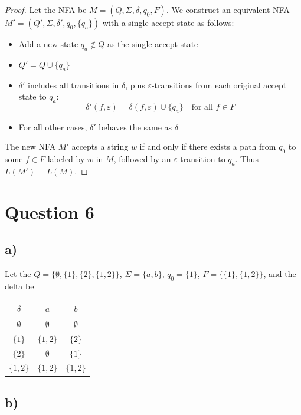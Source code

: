 \documentclass[a4paper, UTF-8]{article}
\theoremstyle{plain}
\begin{document}
\begin{proof}
Let the NFA be $M = (Q, \Sigma, \delta, q_0, F)$. We construct an equivalent NFA 
$M' = (Q', \Sigma, \delta', q_0, \{q_a\})$ with a single accept state as follows:

\begin{itemize}
    \item Add a new state $q_a \notin Q$ as the single accept state
    \item $Q' = Q \cup \{q_a\}$
    \item $\delta'$ includes all transitions in $\delta$, plus $\varepsilon$-transitions 
          from each original accept state to $q_a$:
          $$\delta'(f, \varepsilon) = \delta(f, \varepsilon) \cup \{q_a\} \quad \text{for all } f \in F$$
    \item For all other cases, $\delta'$ behaves the same as $\delta$
\end{itemize}

The new NFA $M'$ accepts a string $w$ if and only if there exists a path from $q_0$ 
to some $f \in F$ labeled by $w$ in $M$, followed by an $\varepsilon$-transition to $q_a$. 
Thus $L(M') = L(M)$.
\end{proof}

\section{Question 6}

\subsection{a)}

Let the $Q = \{\emptyset, \{1\}, \{2\}, \{1, 2\}\}$, $\Sigma = \{a, b\}$, $q_0 = \{1\}$, $F = \{\{1\}, \{1, 2\}\}$, and the delta be 

\begin{center}
\begin{tabular}{c|c|c}
    $\delta$ & $a$ & $b$ \\
    \hline
    $\emptyset$ & $\emptyset$ & $\emptyset$ \\
    $\{1\}$ & $\{1, 2\}$ & $\{2\}$ \\
    $\{2\}$ & $\emptyset$ & $\{1\}$ \\
    $\{1, 2\}$ & $\{1, 2\}$ & $\{1, 2\}$ \\
\end{tabular}
\end{center}

\subsection{b)}
\end{document}
